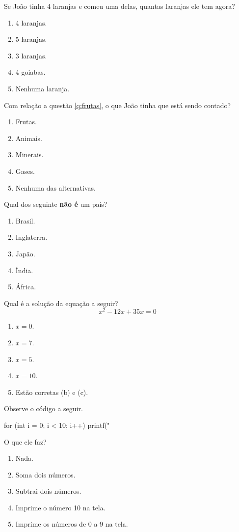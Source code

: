 \documentclass{provaifrs}
\begin{document}
\begin{multicols}{2}
\begin{questoes}
  \item \label{q:frutas}Se João tinha 4 laranjas e comeu uma delas, quantas laranjas ele tem agora?
  \begin{enumerate}
    \item 4 laranjas.
    \item 5 laranjas.
    \item 3 laranjas.
    \item 4 goiabas.
    \item Nenhuma laranja.
  \end{enumerate}

  \item Com relação a questão \ref{q:frutas}, o que João tinha que está sendo contado?
  \begin{enumerate}
    \item Frutas.
    \item Animais.
    \item Minerais.
    \item Gases.
    \item Nenhuma das alternativas.
  \end{enumerate}

  \item Qual dos seguinte \textbf{não é} um país?
  \begin{enumerate}
    \item Brasil.
    \item Inglaterra.
    \item Japão.
    \item Índia.
    \item África.
  \end{enumerate}

  \item Qual é a solução da equação a seguir?
  \[x^2 - 12x + 35x = 0\]
  \begin{enumerate}
    \item $x = 0$.
    \item $x = 7$.
    \item $x = 5$.
    \item $x = 10$.
    \item Estão corretas (b) e (c).
  \end{enumerate}

  \item Observe o código a seguir.
  \begin{snippet}
for (int i = 0; i < 10; i++) {
  printf("%
}
\end{snippet}
  O que ele faz?
  \begin{enumerate}
    \item Nada.
    \item Soma dois números.
    \item Subtrai dois números.
    \item Imprime o número 10 na tela.
    \item Imprime os números de 0 a 9 na tela.
  \end{enumerate}
\end{questoes}
\end{multicols}
\end{document}
